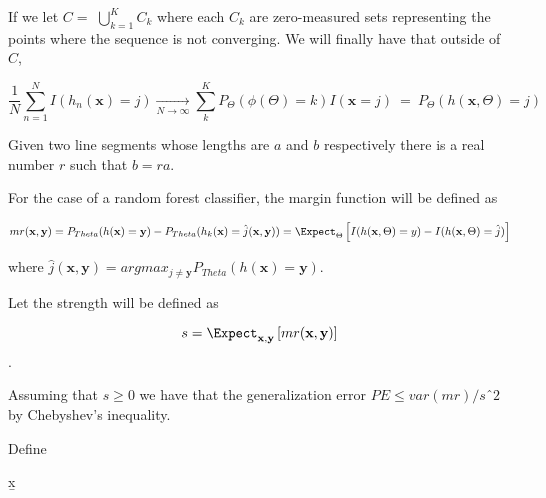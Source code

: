 If we let $C = $ $\bigcup\limits_{k=1}^{K} C_{k}$ where each $C_k$ are zero-measured sets representing the points where the sequence is not converging. We will finally have that  outside of $C$, 

$$ \frac{1}{N} \sum_{n=1}^N I(h_n(\textbf{x}) = j) \xrightarrow[N \to \infty]{} \sum_k^K    P_{\Theta}(\phi(\Theta)= k) I(\textbf{x} =j ) \ = \ P_{\Theta}(h(\textbf{x}, \Theta) = j)  $$ 



\begin{lemma}
Given two line segments whose lengths are $a$ and $b$ respectively there is a 
real number $r$ such that $b=ra$.
\end{lemma}

For the case of a random forest classifier, the margin function will be defined as

\begin{equation} \label{eq:expectedError}
mr(\textbf{x},\textbf{y}) =  P_{Theta}(h(\textbf{x}) = \textbf{y})  
- P_{Theta}(h_k(\textbf{x}) = \hat{j}(\textbf{x},\textbf{y}) ) 

\\ 
= \Expect_{\Theta} \left[  I(h(\textbf{x},\Theta )=y) - I(h(\textbf{x},\Theta )=\hat{j})  \right]

\end{equation} \label{eq:rf-marginFunRf}

where $\hat{j}(\textbf{x},\textbf{y}) = arg max_{j\neq \textbf{y}} P_{Theta}(h(\textbf{x}) = \textbf{y}) $. 


Let the strength will be defined as 

$$s =  \Expect_{\textbf{x},\textbf{y}} \left[ mr(\textbf{x},\textbf{y} ) \right] $$. \label{eq:rf-strength}

Assuming that $s \geq 0$ we have that the generalization error $PE \leq var(mr)/sˆ2$ by Chebyshev's inequality. 

Define 



\b{x}


